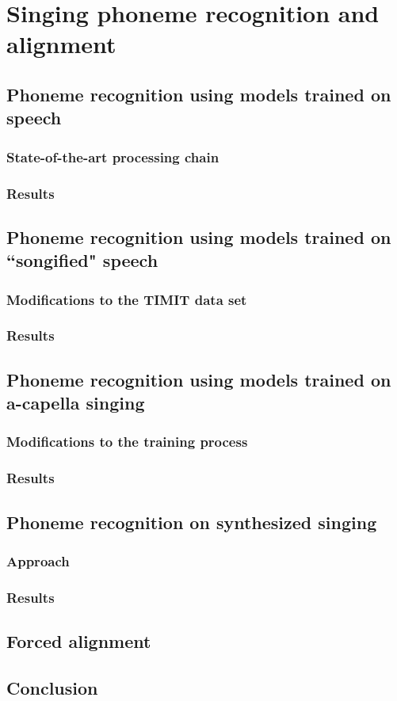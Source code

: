 \chapter{Singing phoneme recognition and alignment} \label{chap:phonerec}
\section{Phoneme recognition using models trained on speech}
\subsection{State-of-the-art processing chain}
\subsection{Results}
\section{Phoneme recognition using models trained on ``songified" speech}
\subsection{Modifications to the TIMIT data set}
\subsection{Results}
\section{Phoneme recognition using models trained on a-capella singing}
\subsection{Modifications to the training process}
\subsection{Results}
\section{Phoneme recognition on synthesized singing}
\subsection{Approach}
\subsection{Results}
\section{Forced alignment}
\section{Conclusion}
